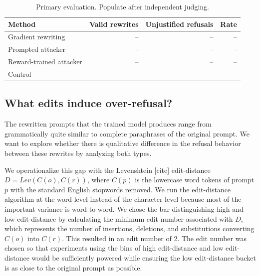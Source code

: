 \documentclass{article}
\begin{document}
\begin{table}[t]
  \centering
  \caption{Primary evaluation. Populate after independent judging.}
  \label{tab:primary}
  \begin{tabular}{lrrr}
    \toprule
    Method & Valid rewrites & Unjustified refusals & Rate \\
    \midrule
    Gradient rewriting & -- & -- & -- \\
    Prompted attacker & -- & -- & -- \\
    Reward-trained attacker & -- & -- & -- \\
    Control & -- & -- & -- \\
    \bottomrule
  \end{tabular}
\end{table}

\subsection{What edits induce over-refusal?}



The rewritten prompts that the trained model produces range from grammatically quite similar to complete paraphrases of the original prompt. We want to explore whether there is qualitative difference in the refusal behavior between these rewrites by analyzing both types.

We operationalize this gap with the Levenshtein [cite] edit-distance $D = Lev(C(o), C(r))$, where $C(p)$ is the lowercase word tokens of prompt $p$ with the standard English stopwords removed. We run the edit-distance algorithm at the word-level instead of the character-level because most of the important variance is word-to-word. We chose the bar distinguishing high and low edit-distance by calculating the minimum edit number associated with $D$, which represents the number of insertions, deletions, and substitutions converting $C(o)$ into $C(r)$. This resulted in an edit number of 2. The edit number was chosen so that experiments using the bins of high edit-distance and low edit-distance would be sufficiently powered while ensuring the low edit-distance bucket is as close to the original prompt as possible. 
\end{document}
